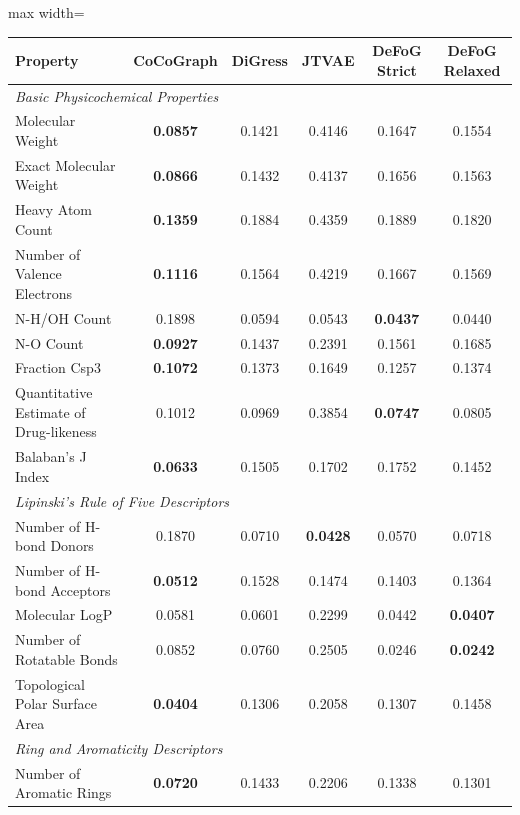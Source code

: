 \begin{table}[h!]
    \centering
    \begin{adjustbox}{max width=\textwidth}
    \begin{tabular}{|l|c|c|c|c|c|}
    \hline
    \textbf{Property} & \textbf{CoCoGraph} & \textbf{DiGress} & \textbf{JTVAE} & \textbf{DeFoG Strict} & \textbf{DeFoG Relaxed} \\
        \hline
    \multicolumn{6}{|l|}{\textit{Basic Physicochemical Properties}} \\
    \hline
    Molecular Weight & \textbf{0.0857} & 0.1421 & 0.4146 & 0.1647 & 0.1554 \\
    Exact Molecular Weight & \textbf{0.0866} & 0.1432 & 0.4137 & 0.1656 & 0.1563 \\
    Heavy Atom Count & \textbf{0.1359} & 0.1884 & 0.4359 & 0.1889 & 0.1820 \\
    Number of Valence Electrons & \textbf{0.1116} & 0.1564 & 0.4219 & 0.1667 & 0.1569 \\
    N-H/OH Count & 0.1898 & 0.0594 & 0.0543 & \textbf{0.0437} & 0.0440 \\
    N-O Count & \textbf{0.0927} & 0.1437 & 0.2391 & 0.1561 & 0.1685 \\
    Fraction Csp3 & \textbf{0.1072} & 0.1373 & 0.1649 & 0.1257 & 0.1374 \\
    Quantitative Estimate of Drug-likeness & 0.1012 & 0.0969 & 0.3854 & \textbf{0.0747} & 0.0805 \\
    Balaban's J Index & \textbf{0.0633} & 0.1505 & 0.1702 & 0.1752 & 0.1452 \\
    \hline
    \multicolumn{6}{|l|}{\textit{Lipinski's Rule of Five Descriptors}} \\
    \hline
    Number of H-bond Donors & 0.1870 & 0.0710 & \textbf{0.0428} & 0.0570 & 0.0718 \\
    Number of H-bond Acceptors & \textbf{0.0512} & 0.1528 & 0.1474 & 0.1403 & 0.1364 \\
    Molecular LogP & 0.0581 & 0.0601 & 0.2299 & 0.0442 & \textbf{0.0407} \\
    Number of Rotatable Bonds & 0.0852 & 0.0760 & 0.2505 & 0.0246 & \textbf{0.0242} \\
    Topological Polar Surface Area & \textbf{0.0404} & 0.1306 & 0.2058 & 0.1307 & 0.1458 \\
    \hline
    \multicolumn{6}{|l|}{\textit{Ring and Aromaticity Descriptors}} \\
    \hline
    Number of Aromatic Rings & \textbf{0.0720} & 0.1433 & 0.2206 & 0.1338 & 0.1301 \\

\end{tabular}
\end{adjustbox}
\end{table}

